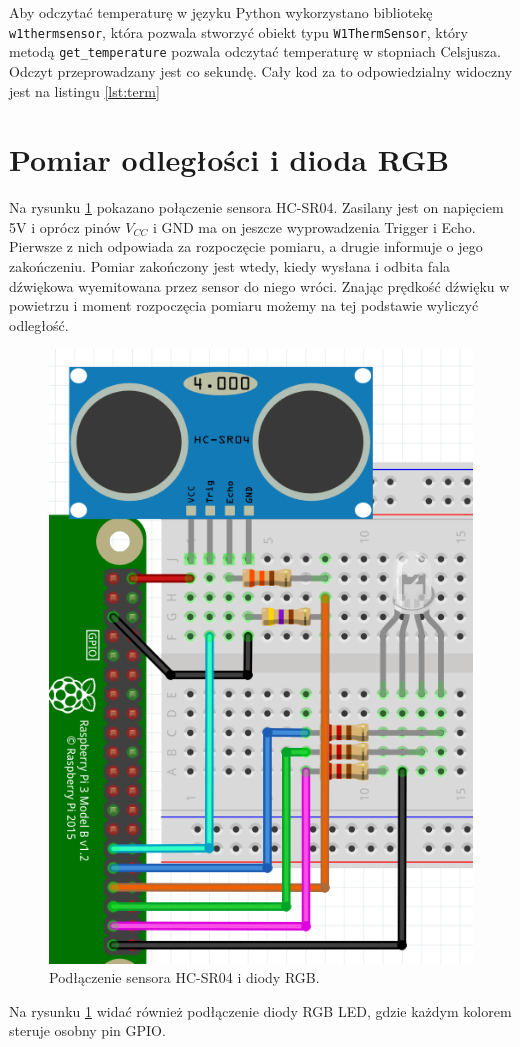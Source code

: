 \documentclass[12pt]{article}
\begin{document}
Aby odczytać temperaturę w języku Python wykorzystano bibliotekę \lstinline{w1thermsensor}, która pozwala stworzyć obiekt typu \lstinline{W1ThermSensor}, który metodą \lstinline{get_temperature} pozwala odczytać temperaturę w stopniach Celsjusza. Odczyt przeprowadzany jest co sekundę. Cały kod za to odpowiedzialny widoczny jest na listingu \ref{lst:term}


\section{Pomiar odległości i dioda RGB}

Na rysunku \ref{sch:4} pokazano połączenie sensora HC-SR04\cite{ultrasonic}. Zasilany jest on napięciem 5V i oprócz pinów $V_{CC}$ i GND ma on jeszcze wyprowadzenia Trigger i Echo. Pierwsze z nich odpowiada za rozpoczęcie pomiaru, a drugie informuje o jego zakończeniu. Pomiar zakończony jest wtedy, kiedy wysłana i odbita fala dźwiękowa wyemitowana przez sensor do niego wróci. Znając prędkość dźwięku w powietrzu i moment rozpoczęcia pomiaru możemy na tej podstawie wyliczyć odległość.


\begin{figure}[H]
  \centering
  \includegraphics[height=0.4\linewidth]{sch4}
  \caption{Podłączenie sensora HC-SR04 i diody RGB.}
  \label{sch:4}
\end{figure}

Na rysunku \ref{sch:4} widać również podłączenie diody RGB LED, gdzie każdym kolorem steruje osobny pin GPIO.
\end{document}
